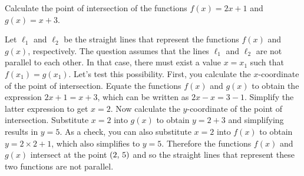 \documentclass[a4paper,oneside,12pt]{article}
\begin{document}
\begin{example}
\label{ex:intersection_2x_plus_1_x_plus_3}
Calculate the point of intersection of the functions $f(x) = 2x + 1$
and $g(x) = x + 3$.
\end{example}

\begin{solution}
Let $\ell_1$ and $\ell_2$ be the straight lines that represent the
functions $f(x)$ and $g(x)$, respectively.  The question assumes that
the lines $\ell_1$ and $\ell_2$ are not parallel to each other.  In
that case, there must exist a value $x = x_1$ such that
$f(x_1) = g(x_1)$.  Let's test this possibility.  First, you calculate
the $x$-coordinate of the point of intersection.  Equate the functions
$f(x)$ and $g(x)$ to obtain the expression $2x + 1 = x + 3$, which can
be written as $2x - x = 3 - 1$.  Simplify the latter expression to get
$x = 2$.  Now calculate the $y$-coordinate of the point of
intersection.  Substitute $x = 2$ into $g(x)$ to obtain $y = 2 + 3$
and simplifying results in $y = 5$.  As a check, you can also
substitute $x = 2$ into $f(x)$ to obtain $y = 2 \times 2 + 1$, which
also simplifies to $y = 5$.  Therefore the functions $f(x)$ and $g(x)$
intersect at the point $\left\lparen{2},\, {5}\right\rparen$ and so the straight lines that
represent these two functions are not parallel.
\end{solution}
\end{document}
